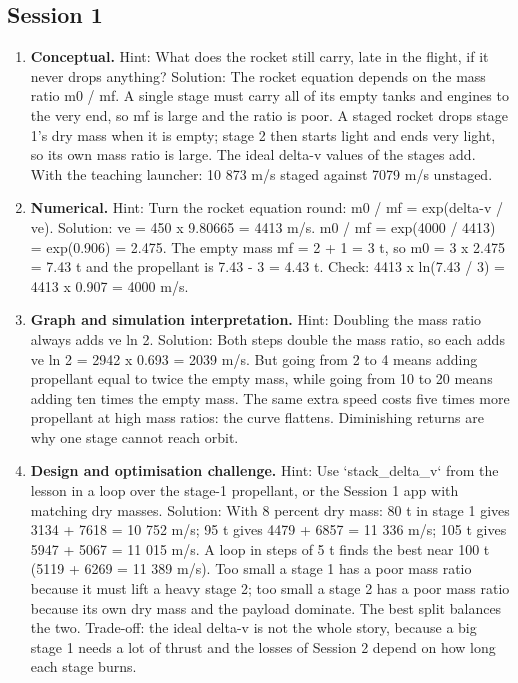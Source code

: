 \documentclass[11pt,a4paper]{article}
\begin{document}
\subsection*{Session 1}
\begin{enumerate}[nosep]
\item \textbf{Conceptual.} Hint: What does the rocket still carry, late in the flight, if it never drops anything? Solution: The rocket equation depends on the mass ratio m0 / mf. A single stage must carry all of its empty tanks and engines to the very end, so mf is large and the ratio is poor. A staged rocket drops stage 1's dry mass when it is empty; stage 2 then starts light and ends very light, so its own mass ratio is large. The ideal delta-v values of the stages add. With the teaching launcher: 10 873 m/s staged against 7079 m/s unstaged.
\item \textbf{Numerical.} Hint: Turn the rocket equation round: m0 / mf = exp(delta-v / ve). Solution: ve = 450 x 9.80665 = 4413 m/s. m0 / mf = exp(4000 / 4413) = exp(0.906) = 2.475. The empty mass mf = 2 + 1 = 3 t, so m0 = 3 x 2.475 = 7.43 t and the propellant is 7.43 - 3 = 4.43 t. Check: 4413 x ln(7.43 / 3) = 4413 x 0.907 = 4000 m/s.
\item \textbf{Graph and simulation interpretation.} Hint: Doubling the mass ratio always adds ve ln 2. Solution: Both steps double the mass ratio, so each adds ve ln 2 = 2942 x 0.693 = 2039 m/s. But going from 2 to 4 means adding propellant equal to twice the empty mass, while going from 10 to 20 means adding ten times the empty mass. The same extra speed costs five times more propellant at high mass ratios: the curve flattens. Diminishing returns are why one stage cannot reach orbit.
\item \textbf{Design and optimisation challenge.} Hint: Use `stack\_delta\_v` from the lesson in a loop over the stage-1 propellant, or the Session 1 app with matching dry masses. Solution: With 8 percent dry mass: 80 t in stage 1 gives 3134 + 7618 = 10 752 m/s; 95 t gives 4479 + 6857 = 11 336 m/s; 105 t gives 5947 + 5067 = 11 015 m/s. A loop in steps of 5 t finds the best near 100 t (5119 + 6269 = 11 389 m/s). Too small a stage 1 has a poor mass ratio because it must lift a heavy stage 2; too small a stage 2 has a poor mass ratio because its own dry mass and the payload dominate. The best split balances the two. Trade-off: the ideal delta-v is not the whole story, because a big stage 1 needs a lot of thrust and the losses of Session 2 depend on how long each stage burns.
\end{enumerate}
\end{document}

